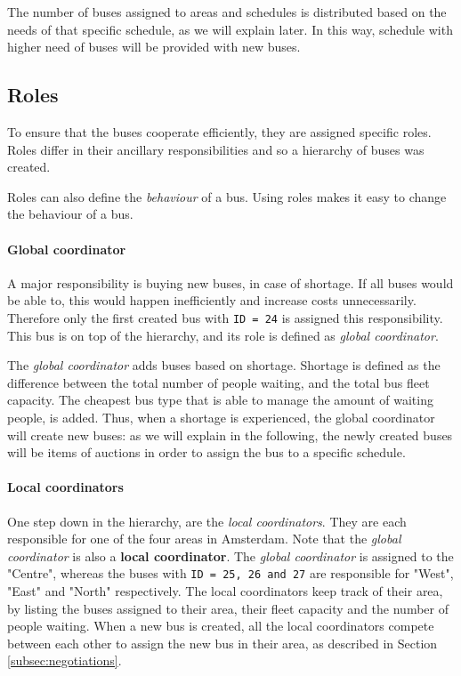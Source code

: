 The number of buses assigned to areas and schedules is distributed based on the needs of that specific schedule, as we will explain later. In this way, schedule with higher need of buses will be provided with new buses.

\subsection{Roles}
\label{subsec:roles}

To ensure that the buses cooperate efficiently, they are assigned specific roles. Roles differ in their ancillary responsibilities and so a hierarchy of buses was created. 

Roles can also define the \textit{behaviour} of a bus. Using roles makes it easy to change the behaviour of a bus.

\paragraph{Global coordinator}

A major responsibility is buying new buses, in case of shortage. If all buses would be able to, this would happen inefficiently and increase costs unnecessarily. Therefore only the first created bus with \texttt{ID = 24} is assigned this responsibility. This bus is on top of the hierarchy, and its role is defined as \textit{global coordinator}. 

The \textit{global coordinator} adds buses based on shortage. Shortage is defined as the difference between the total number of people waiting, and the total bus fleet capacity. The cheapest bus type that is able to manage the amount of waiting people, is added. Thus, when a shortage is experienced, the global coordinator will create new buses: as we will explain in the following, the newly created buses will be items of auctions in order to assign the bus to a specific schedule.

\paragraph{Local coordinators}

One step down in the hierarchy, are the \textit{local coordinators}. They are each responsible for one of the four areas in Amsterdam. Note that the \textit{global coordinator} is also a \textbf{local coordinator}. The \textit{global coordinator} is assigned to the "Centre", whereas the buses with \texttt{ID = 25, 26 and 27} are responsible for "West", "East" and "North" respectively. The local coordinators keep track of their area, by listing the buses assigned to their area, their fleet capacity and the number of people waiting. When a new bus is created, all the local coordinators compete between each other to assign the new bus in their area, as described in Section \ref{subsec:negotiations}.

